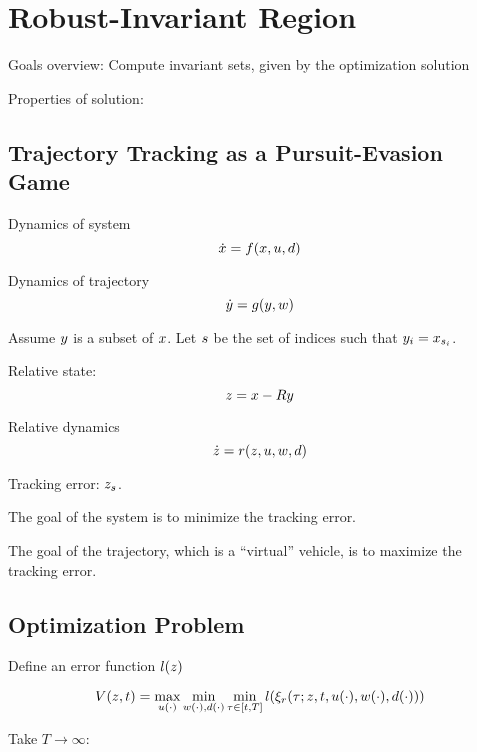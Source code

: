 \section{Robust-Invariant Region \label{sec:reachability}}
Goals overview: Compute invariant sets, given by the optimization solution

Properties of solution: 

\subsection{Trajectory Tracking as a Pursuit-Evasion Game}
Dynamics of system
\begin{equation}
\dot{x} = f(x, u, d)
\end{equation}

Dynamics of trajectory
\begin{equation}
\dot{y} = g(y, w)
\end{equation}

Assume $y$ is a subset of $x$. Let $s$ be the set of indices such that $y_i = x_{s_i}$.

Relative state:
\begin{equation}
z = x - Ry
\end{equation}

Relative dynamics
\begin{equation}
\dot{z} = r(z, u, w, d)
\end{equation}

Tracking error: $z_{s}$.

The goal of the system is to minimize the tracking error.

The goal of the trajectory, which is a ``virtual'' vehicle, is to maximize the tracking error.

\subsection{Optimization Problem}
Define an error function $l(z)$

\begin{equation}
V(z, t) = \max_{u(\cdot)} \min_{w(\cdot), d(\cdot)} \min_{\tau \in [t, T]} l(\xi_r(\tau; z, t, u(\cdot), w(\cdot), d(\cdot))) 
\end{equation}

Take $T \rightarrow \infty$:

